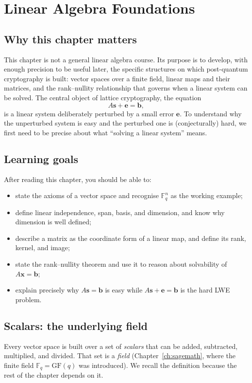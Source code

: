 \chapter{Linear Algebra Foundations}
\label{ch:linalg}

\section{Why this chapter matters}
This chapter is not a general linear algebra course. Its purpose is to develop, with enough precision to be useful later, the specific structures on which post-quantum cryptography is built: vector spaces over a finite field, linear maps and their matrices, and the rank--nullity relationship that governs when a linear system can be solved. The central object of lattice cryptography, the equation
\[
A\mathbf{s} + \mathbf{e} = \mathbf{b},
\]
is a linear system deliberately perturbed by a small error $\mathbf{e}$. To understand why the unperturbed system is easy and the perturbed one is (conjecturally) hard, we first need to be precise about what ``solving a linear system'' means.

\section{Learning goals}
After reading this chapter, you should be able to:

\begin{itemize}
  \item state the axioms of a vector space and recognise $\mathbb{F}_q^n$ as the working example;
  \item define linear independence, span, basis, and dimension, and know why dimension is well defined;
  \item describe a matrix as the coordinate form of a linear map, and define its rank, kernel, and image;
  \item state the rank--nullity theorem and use it to reason about solvability of $A\mathbf{x}=\mathbf{b}$;
  \item explain precisely why $A\mathbf{s}=\mathbf{b}$ is easy while $A\mathbf{s}+\mathbf{e}=\mathbf{b}$ is the hard LWE problem.
\end{itemize}

\section{Scalars: the underlying field}
Every vector space is built over a set of \emph{scalars} that can be added, subtracted, multiplied, and divided. That set is a \emph{field} (Chapter~\ref{ch:sagemath}, where the finite field $\mathbb{F}_q = \mathrm{GF}(q)$ was introduced). We recall the definition because the rest of the chapter depends on it.


